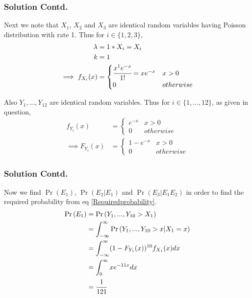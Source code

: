 \documentclass{beamer}
\providecommand{\pr}[1]{\ensuremath{\Pr\left(#1\right)}}
\begin{document}
\begin{frame}
\frametitle{Solution Contd.}

Next we note that $X_1$, $X_2$ and $X_3$ are identical random variables having Poisson distribution with rate 1. Thus for $i \in \{1,2,3\}$,
\begin{align}
    \lambda &= 1*X_i = X_i\\
    k &= 1\\
    \implies f_{X_i}(x) &= 
    \begin{cases}
        \cfrac{x^1e^{-x}}{1!} = x e^{-x} &x > 0\\
        0                                &otherwise
    \end{cases}
\end{align}

Also $Y_1,...,Y_{12}$ are identical random variables. Thus for $i \in \{1,...,12\}$, as given in question,
\begin{align}
    f_{Y_i}(x) &= 
    \begin{cases}
        e^{-x} & x > 0\\
        0      & otherwise
    \end{cases}\\
    \implies F_{Y_i}(x) &= 
    \begin{cases}
        1-e^{-x} & x > 0\\
        0        & otherwise
    \end{cases}
\end{align}

\end{frame}
\begin{frame}
\frametitle{Solution Contd.}

Now we find $\pr{E_1}$, $\pr{E_2|E_1}$ and $\pr{E_3|E_1E_2}$ in order to find the required probability from eq \eqref{Requiredprobability}.
\begin{align}
    \pr{E_1} &= \pr{Y_1,...,Y_{10} > X_1}\\
             &= \int_{-\infty}^{\infty} \pr{Y_1,...,Y_{10} > x|X_1 = x}\\
             &= \int_{-\infty}^{\infty} (1-F_{Y_1}(x))^{10} f_{X_1}(x)dx\\
             &= \int_0^{\infty} xe^{-11x} dx\\
             &= \cfrac{1}{121}
\end{align}

\end{frame}
\end{document}
